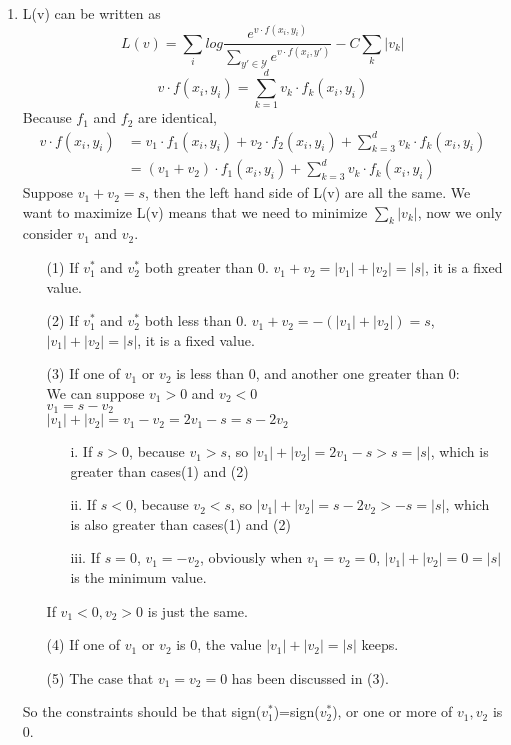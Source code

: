 \documentclass[12pt]{article}
\begin{document}
\begin{enumerate}
	\item
	L(v) can be written as
	$$L(v)=\sum_{i}log\frac{e^{v\cdot f(x_i,y_i)}}{\sum _{y'\in \mathcal Y}e^{v\cdot f(x_i,y')}}-C\sum _k|v_k|$$
	$$v\cdot f(x_i,y_i)=\sum_{k=1}^{d}v_k\cdot f_k(x_i,y_i)$$
	Because $f_1$ and $f_2$ are identical, 
	\begin{align*}
	v\cdot f(x_i,y_i)&= v_1\cdot f_1(x_i,y_i)+v_2\cdot f_2(x_i,y_i)+\sum_{k=3}^{d}v_k\cdot f_k(x_i,y_i)\\ 
	&= (v_1+v_2)\cdot f_1(x_i,y_i)+\sum_{k=3}^{d}v_k\cdot f_k(x_i,y_i)
	\end{align*}
	Suppose $v_1+v_2=s$, then the left hand side of L(v) are all the same. We want to maximize L(v) means that we need to minimize $\sum _k|v_k|$, now we only consider $v_1$ and $v_2$.\\
	\begin{enumerate}
		\item [(1)]
		If $v_1^*$ and $v_2^*$ both greater than 0. $v_1+v_2=|v_1|+|v_2|=|s|$, it is a fixed value.\\
		\item [(2)]
		If $v_1^*$ and $v_2^*$ both less than 0. $v_1+v_2=-(|v_1|+|v_2|)=s$, $|v_1|+|v_2|=|s|$, it is a fixed value.\\
		\item [(3)] 
		If one of $v_1$ or $v_2$ is less than 0, and another one greater than 0:\\
		We can suppose $v_1>0$ and $v_2<0$\\
		$v_1=s-v_2$\\
		$|v_1|+|v_2|=v_1-v_2=2v_1-s=s-2v_2$\\
		\begin{enumerate}
			\item [i.]
			If $s>0$, because $v_1>s$, so $|v_1|+|v_2|=2v_1-s>s=|s|$, which is greater than cases(1) and (2)\\
			\item [ii.]
			If $s<0$, because $v_2<s$, so $|v_1|+|v_2|=s-2v_2>-s=|s|$, which is also greater than cases(1) and (2)\\
			\item [iii.]
			If $s=0$, $v_1=-v_2$, obviously when $v_1=v_2=0$, $|v_1|+|v_2|=0=|s|$ is the minimum value.\\
		\end{enumerate}
	If $v_1<0, v_2>0$ is just the same.\\
	\item [(4)]
	If one of $v_1$ or $v_2$ is 0, the value $|v_1|+|v_2|=|s|$ keeps.\\
	\item [(5)]
	The case that $v_1=v_2=0$ has been discussed in (3).\\
	\end{enumerate}
	So the constraints should be that sign($v_1^*$)=sign($v_2^*$), or one or more of $v_1, v_2$ is 0.
	
\end{enumerate}
\end{document}
